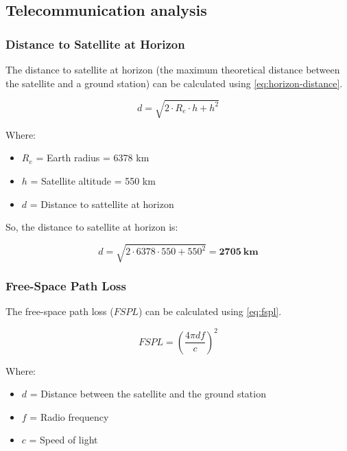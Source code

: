 \subsection{Telecommunication analysis}

\subsubsection{Distance to Satellite at Horizon}

The distance to satellite at horizon (the maximum theoretical distance between the satellite and a ground station) can be calculated using \autoref{eq:horizon-distance}.

\begin{equation} \label{eq:horizon-distance}
d = \sqrt{2\cdot R_{e}\cdot h + h^{2}}
\end{equation}

Where:

\begin{itemize}
    \item $R_{e}$ = Earth radius = 6378 km
    \item $h$ = Satellite altitude = 550 km
    \item $d$ = Distance to sattellite at horizon
\end{itemize}

So, the distance to satellite at horizon is:

\begin{equation} \label{eq:horizon-distance-result}
d = \sqrt{2\cdot 6378\cdot 550 + 550^{2}} = \mathbf{2705\ km}
\end{equation}

\subsubsection{Free-Space Path Loss}

The free-space path loss ($FSPL$) can be calculated using \autoref{eq:fspl}.

\begin{equation} \label{eq:fspl}
FSPL = \left( \frac{4\pi d f}{c} \right)^{2}
\end{equation}

Where:

\begin{itemize}
    \item $d$ = Distance between the satellite and the ground station
    \item $f$ = Radio frequency
    \item $c$ = Speed of light
\end{itemize}

